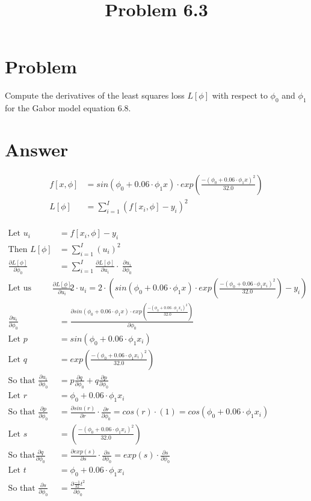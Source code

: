 \documentclass{article}
\title{Problem 6.3}
\begin{document}
\section{Problem}

Compute the derivatives of the least squares loss $ L [ \phi ] $  with respect to $ \phi_0 $ and $\phi_1$ for the Gabor model equation 6.8. 

\section{Answer}

\begin{align}
    f[x,\phi] &= sin(\phi_0 + 0.06 \cdot \phi_1x) \cdot exp  \left( \frac{-(\phi_0 + 0.06 \cdot \phi_1x)^2}{32.0} \right)
    \\
    L[\phi]   &= \sum_{i=1}^{I} (f[x_i, \phi]-y_i)^2
    \\
\end{align}

\begin{align*}
\text{Let } u_i &= f[x_i, \phi]-y_i \\
\text{Then } L [\phi] &= \sum_{i=1}^{I} (u_i)^2 \\
\frac{\partial{L[\phi]}}{\partial{\phi_0}} &= \sum_{i=1}^{I}  \frac{\partial{L[\phi]}}{\partial{u_i}} \cdot \
 \frac{\partial{u_i}}{\partial{\phi_0}}
 \\
 \text{Let us break it down } \frac{\partial{L[\phi]}}{\partial{u_i}} &= 2 \cdot u_i = 2 \cdot \left( sin(\phi_0 + 0.06 \cdot \phi_1x) \cdot exp  \left( \frac{-(\phi_0 + 0.06 \cdot \phi_1x_i)^2}{32.0} \right) - y_i \right)
 \\
 \frac{\partial{u_i}}{\partial{\phi_0}} &= \frac{\partial{sin(\phi_0 + 0.06 \cdot \phi_1x) \cdot exp  \left( \frac{-(\phi_0 + 0.06 \cdot \phi_1x_i)^2}{32.0} \right)}}{\partial{\phi_0}} \\
 \text{Let } p &= sin(\phi_0 + 0.06 \cdot \phi_1x_i) \\
 \text{Let } q &= exp  \left( \frac{-(\phi_0 + 0.06 \cdot \phi_1x_i)^2}{32.0} \right) \\
 \text{So that } \frac{\partial{u_i}}{\partial{\phi_0}} &= p\frac{\partial{q}}{\partial{\phi_0}} + q \frac{\partial{p}}{\partial{\phi_0}}
 \\
 \text{Let } r &= \phi_0 + 0.06 \cdot \phi_1 x_i
 \\
 \text{So that } \frac{\partial{p}}{\partial{\phi_0}} &= \frac{\partial{sin(r)}}{\partial{r}} \cdot \frac{\partial{r}}{\partial{\phi_0}} = cos (r) \cdot (1) = cos(\phi_0 + 0.06\cdot \phi_1 x_i)
 \\
 \text{Let } s &= \left( \frac{-(\phi_0 + 0.06 \cdot \phi_1x_i)^2}{32.0} \right)
 \\
 \text{So that} \frac{\partial{q}}{\partial{\phi_0}} &= \frac{\partial{exp(s)}}{\partial{s}} \cdot \frac{\partial{s}}{\partial{\phi_0}} = exp(s) \cdot \frac{\partial{s}}{\partial{\phi_0}}
 \\
 \text{Let }t &= \phi_0 + 0.06 \cdot \phi_1x_i
 \\
 \text{So that } \frac{\partial{s}}{\partial{\phi_0}} &= \frac{\partial{\frac{-1}{32}}t^2}{\partial{\phi_0}}
\end{align*}
\end{document}
